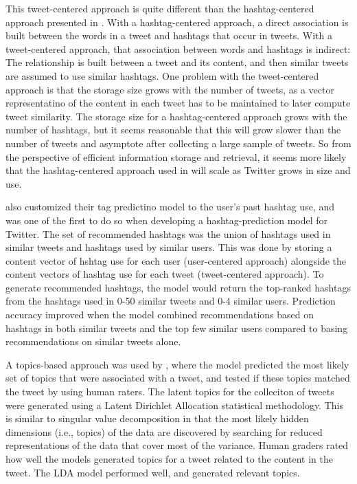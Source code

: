 \documentclass[man,floatsintext]{apa6}
\begin{document}
This tweet-centered approach is quite different than the hashtag-centered approach presented in \textcite{Mazzia2009}.
With a hashtag-centered approach, a direct association is built between the words in a tweet and hashtags that occur in tweets.
With a tweet-centered approach, that association between words and hashtags is indirect:
The relationship is built between a tweet and its content, and then similar tweets are assumed to use similar hashtags.
One problem with the tweet-centered approach is that the storage size grows with the number of tweets, as a vector representatino of the content in each tweet has to be maintained to later compute tweet similarity.
The storage size for a hashtag-centered approach grows with the number of hashtags, but it seems reasonable that this will grow slower than the number of tweets and asymptote after collecting a large sample of tweets.
So from the perspective of efficient information storage and retrieval, it seems more likely that the hashtag-centered approach used in \textcite{Mazzia2009} will scale as Twitter grows in size and use.

\textcite{Kywe2012} also customized their tag predictino model to the user's past hashtag use, and was one of the first to do so when developing a hashtag-prediction model for Twitter.
The set of recommended hashtags was the union of hashtags used in similar tweets and hashtags used by similar users.
This was done by storing a content vector of hshtag use for each user (user-centered approach) alongside the content vectors of hashtag use for each tweet (tweet-centered approach).
To generate recommended hashtags, the model would return the top-ranked hashtags from the hashtags used in 0-50 similar tweets and 0-4 similar users.
Prediction accuracy improved when the model combined recommendations based on hashtags in both similar tweets and the top few similar users compared to basing recommendations on similar tweets alone. 

A topics-based approach was used by \textcite{Godin2013}, where the model predicted the most likely set of topics that were associated with a tweet, and tested if these topics matched the tweet by using human raters.
The latent topics for the colleciton of tweets were generated using a Latent Dirichlet Allocation statistical methodology.
This is similar to singular value decomposition in that the most likely hidden dimensions (i.e., topics) of the data are discovered by searching for reduced representations of the data that cover most of the variance. 
Human graders rated how well the models generated topics for a tweet related to the content in the tweet.
The LDA model performed well, and generated relevant topics.
\end{document}
